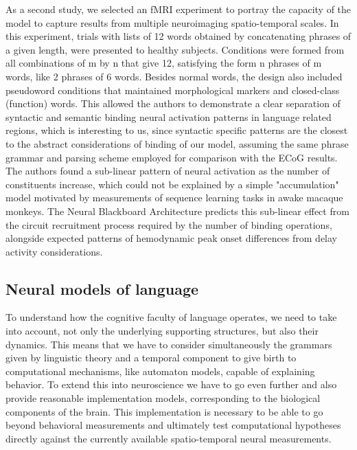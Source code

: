 \documentclass[10pt]{article}
\begin{document}
As a second study, we selected an fMRI experiment \cite{Pallier_2011} to portray the capacity of the model to capture results from multiple neuroimaging spatio-temporal scales.
In this experiment, trials with lists of 12 words obtained by concatenating phrases of a given length, were presented to healthy subjects.
Conditions were formed from all combinations of m by n that give 12, satisfying the form n phrases of m words, like 2 phrases of 6 words.
Besides normal words, the design also included pseudoword conditions that maintained morphological markers and closed-class (function) words.
This allowed the authors to demonstrate a clear separation of syntactic and semantic binding neural activation patterns in language related regions, which is interesting to us, 
since syntactic specific patterns are the closest to the abstract considerations of binding of our model, assuming the same phrase grammar and parsing scheme employed for 
comparison with the ECoG results.
The authors found a sub-linear pattern of neural activation as the number of constituents increase, which could not be explained by a simple "accumulation" model motivated by 
measurements of sequence learning tasks in awake macaque monkeys.
The Neural Blackboard Architecture predicts this sub-linear effect from the circuit recruitment process required by the number of binding operations, 
alongside expected patterns of hemodynamic peak onset differences from delay activity considerations.


\subsection{Neural models of language}

{\label{619233}}

To understand how the cognitive faculty of language operates, we need to take into account, not only the underlying supporting structures, but also their dynamics. 
This means that we have to consider simultaneously the grammars given by linguistic theory and a temporal component to give birth to computational mechanisms, like 
automaton models, capable of explaining behavior\cite{hale2014automaton}.
To extend this into neuroscience we have to go even further and also provide reasonable implementation models, corresponding to the biological components of the brain.
This implementation is necessary to be able to go beyond behavioral measurements and ultimately test computational hypotheses directly against the currently available spatio-temporal neural measurements.
\end{document}
